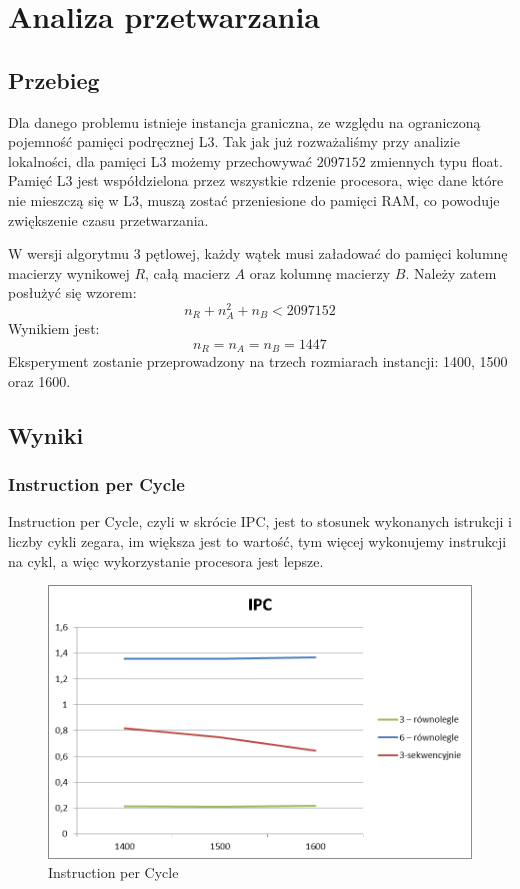 \documentclass{article}
\begin{document}
\section{Analiza przetwarzania}
\subsection{Przebieg}

Dla danego problemu istnieje instancja graniczna, ze względu na ograniczoną pojemność pamięci podręcznej L3. Tak jak już rozważaliśmy przy analizie lokalności, dla pamięci L3 możemy przechowywać $2097152$ zmiennych typu float. Pamięć L3 jest współdzielona przez wszystkie rdzenie procesora, więc dane które nie mieszczą się w L3, muszą zostać przeniesione do pamięci RAM, co powoduje zwiększenie czasu przetwarzania.

W wersji algorytmu 3 pętlowej, każdy wątek musi załadować do pamięci kolumnę macierzy wynikowej $R$, całą macierz $A$ oraz kolumnę macierzy $B$.
Należy zatem posłużyć się wzorem:
\[ n_R + n_A^2 + n_B < 2097152 \]
Wynikiem jest:
\[ n_R = n_A = n_B = 1447\]
Eksperyment zostanie przeprowadzony na trzech rozmiarach instancji: 1400, 1500 oraz 1600.


\subsection{Wyniki}
\subsubsection{Instruction per Cycle}
Instruction per Cycle, czyli w skrócie IPC, jest to stosunek wykonanych istrukcji i liczby cykli zegara, im większa jest to wartość, tym więcej wykonujemy instrukcji na cykl, a więc wykorzystanie procesora jest lepsze.

\begin{figure}[H]
	\centering
	\includegraphics[width=\linewidth]{./images/wykresy/IPC.png}
	\caption{Instruction per Cycle}
	\label{fig:wykres1}
\end{figure}
\end{document}
